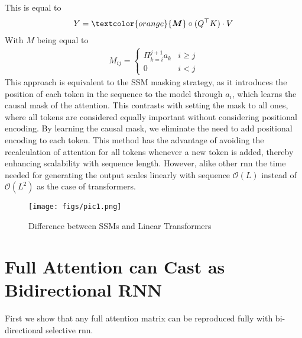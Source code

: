 This is equal to 
\begin{align*}
    Y = \textcolor{orange}{\boldsymbol{M}} \circ (Q^{\top}K) \cdot V
\end{align*}
With $M$ being equal to
\begin{align*}
    M_{ij} = 
    \begin{cases} 
    \Pi_{k=i}^{j+1}a_k & i\geq j  \\
    0 & i<j
\end{cases}
\end{align*}
This approach is equivalent to the SSM masking strategy, as it introduces the position of each token in the sequence to the model through \(a_i\), which learns the causal mask of the attention. This contrasts with setting the mask to all ones, where all tokens are considered equally important without considering positional encoding. By learning the causal mask, we eliminate the need to add positional encoding to each token. This method has the advantage of avoiding the recalculation of attention for all tokens whenever a new token is added, thereby enhancing scalability with sequence length. However, alike other \gls{rnn} the time needed for generating the output scales linearly with sequence $\mathcal{O}(L)$ instead of $\mathcal{O}(L^2)$ as the case of transformers.

\begin{figure}[t]
    \centering
    \texttt{[image: figs/pic1.png]}
    \caption{Difference between SSMs and Linear Transformers}
    \label{fig:model}
\end{figure}



\section{Full Attention can Cast as Bidirectional RNN}

First we show that any full attention matrix can be reproduced fully with bi-directional selective \gls{rnn}.

